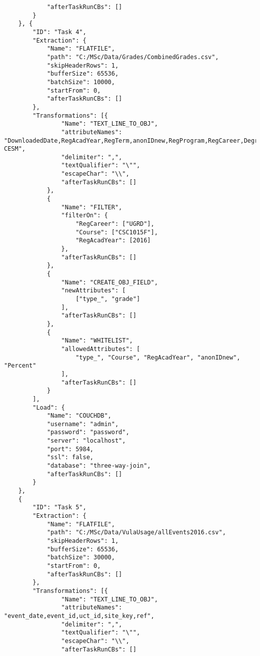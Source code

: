 \begin{verbatim}
            "afterTaskRunCBs": []
        }
    }, {
        "ID": "Task 4",
        "Extraction": {
            "Name": "FLATFILE",
            "path": "C:/MSc/Data/Grades/CombinedGrades.csv",
            "skipHeaderRows": 1,
            "bufferSize": 65536,
            "batchSize": 10000,
            "startFrom": 0,
            "afterTaskRunCBs": []
        },
        "Transformations": [{
                "Name": "TEXT_LINE_TO_OBJ",
                "attributeNames": "DownloadedDate,RegAcadYear,RegTerm,anonIDnew,RegProgram,RegCareer,Degree,DegreeDescr,Subject,Catalog.,Course,CourseSuffix,Session,Percent,Symbol,UnitsTaken,CourseID,CourseDescr,CourseCareer,Faculty,Dept,MaximumCrseUnits,CourseCount,CourseLevel,CESM,Sub-CESM",
                "delimiter": ",",
                "textQualifier": "\"",
                "escapeChar": "\\",
                "afterTaskRunCBs": []
            },
            {
                "Name": "FILTER",
                "filterOn": {
                    "RegCareer": ["UGRD"],
                    "Course": ["CSC1015F"],
                    "RegAcadYear": [2016]
                },
                "afterTaskRunCBs": []
            },
            {
                "Name": "CREATE_OBJ_FIELD",
                "newAttributes": [
                    ["type_", "grade"]
                ],
                "afterTaskRunCBs": []
            },
            {
                "Name": "WHITELIST",
                "allowedAttributes": [
                    "type_", "Course", "RegAcadYear", "anonIDnew", "Percent"
                ],
                "afterTaskRunCBs": []
            }
        ],
        "Load": {
            "Name": "COUCHDB",
            "username": "admin",
            "password": "password",
            "server": "localhost",
            "port": 5984,
            "ssl": false,
            "database": "three-way-join",
            "afterTaskRunCBs": []
        }
    },
    {
        "ID": "Task 5",
        "Extraction": {
            "Name": "FLATFILE",
            "path": "C:/MSc/Data/VulaUsage/allEvents2016.csv",
            "skipHeaderRows": 1,
            "bufferSize": 65536,
            "batchSize": 30000,
            "startFrom": 0,
            "afterTaskRunCBs": []
        },
        "Transformations": [{
                "Name": "TEXT_LINE_TO_OBJ",
                "attributeNames": "event_date,event_id,uct_id,site_key,ref",
                "delimiter": ",",
                "textQualifier": "\"",
                "escapeChar": "\\",
                "afterTaskRunCBs": []

\end{verbatim}
